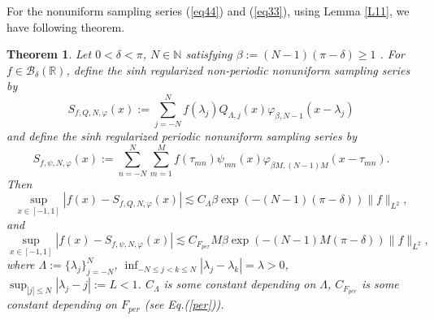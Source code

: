 \documentclass[a4paper]{article}
\newtheorem{theorem}{\bf Theorem}[section]
\numberwithin{equation}{section}
\begin{document}
For the nonuniform sampling series (\ref{eq44}) and (\ref{eq33}), using Lemma \ref{L11}, we have following theorem. 
\begin{theorem}
 Let $0<\delta<\pi$,  $N\in \mathbb{N}$ satisfying  $\beta:=(N-1)(\pi-\delta)\ge 1$ .
 For $f\in \mathcal{B}_{\delta}(\mathbb{R})$, define the sinh regularized  non-periodic nonuniform sampling series by $$S_{f,Q,N, \varphi}(x):=\sum_{j=-N}^{N} f(\lambda_{j})Q_{\Lambda,j}(x) \varphi_{\beta,N-1}(x-\lambda_j)$$ 
 and define the sinh regularized periodic nonuniform sampling series by $$S_{f,\psi,N,\varphi}(x):=  \sum_{n=-N}^{N} \sum_{m=1}^{M} f(\tau_{mn}) \psi_{mn}(x) \varphi_{\beta M,(N-1)M} (x-\tau_{mn}) .$$
Then
 \begin{equation}\label{511}    
 \sup_{x\in [-1,1]}|f(x) - S_{f,Q,N,\varphi}(x)|\lesssim C_{\Lambda}\beta\exp(-(N-1)(\pi-\delta))\|f\|_{L^2}  , \end{equation}
and  \begin{equation}\label{611}\sup_{x\in [-1,1]}|f(x) - S_{f,\psi,N,\varphi}(x)|\lesssim C_{F_{per}} M\beta\exp(-(N-1)M(\pi-\delta))\|f\|_{L^2} ,\end{equation}
where  $\Lambda:=\{\lambda_{j}\}_{j=-N}^{N}$, $\inf_{-N\le j<k\le N}|\lambda_{j}-\lambda_{k}|=\lambda>0$, $\sup_{|j|\le N}|\lambda_{j}-j|:=L<1$. $C_{ \Lambda}$ is some constant depending on $\Lambda$, $C_{F_{per}}$ is some constant depending on  $F_{per}$ (see  Eq.(\ref{per})).
\end{theorem}
\end{document}
